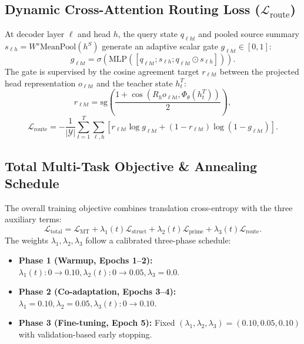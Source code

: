 \documentclass[11pt,a4paper]{article}
\begin{document}
\subsection{Dynamic Cross-Attention Routing Loss ($\mathcal{L}_{\text{route}}$)}
At decoder layer $\ell$ and head $h$, the query state $q_{\ell h t}$ and pooled source summary $s_{\ell h} = W^s \text{MeanPool}(h^S)$ generate an adaptive scalar gate $g_{\ell h t} \in [0, 1]$:
\begin{equation}
    g_{\ell h t} = \sigma\left(\text{MLP}\left([q_{\ell h t}; s_{\ell h}; q_{\ell h t} \odot s_{\ell h}]\right)\right).
\end{equation}
The gate is supervised by the cosine agreement target $r_{\ell h t}$ between the projected head representation $o_{\ell h t}$ and the teacher state $h_t^T$:
\begin{equation}
    r_{\ell h t} = \text{sg}\left(\frac{1 + \cos(R_h o_{\ell h t}, \Phi_\theta(h_t^T))}{2}\right),
\end{equation}
\begin{equation}
    \mathcal{L}_{\text{route}} = -\frac{1}{|\mathcal{Y}|} \sum_{t=1}^T \sum_{\ell, h} \left[ r_{\ell h t} \log g_{\ell h t} + (1 - r_{\ell h t}) \log (1 - g_{\ell h t}) \right].
\end{equation}

\subsection{Total Multi-Task Objective \& Annealing Schedule}
The overall training objective combines translation cross-entropy with the three auxiliary terms:
\begin{equation}
    \mathcal{L}_{\text{total}} = \mathcal{L}_{\text{MT}} + \lambda_1(t) \mathcal{L}_{\text{struct}} + \lambda_2(t) \mathcal{L}_{\text{prime}} + \lambda_3(t) \mathcal{L}_{\text{route}}.
\end{equation}
The weights $\lambda_1, \lambda_2, \lambda_3$ follow a calibrated three-phase schedule:
\begin{itemize}[leftmargin=*]
    \item \textbf{Phase 1 (Warmup, Epochs 1--2):} $\lambda_1(t): 0 \rightarrow 0.10, \lambda_2(t): 0 \rightarrow 0.05, \lambda_3 = 0.0$.
    \item \textbf{Phase 2 (Co-adaptation, Epochs 3--4):} $\lambda_1 = 0.10, \lambda_2 = 0.05, \lambda_3(t): 0 \rightarrow 0.10$.
    \item \textbf{Phase 3 (Fine-tuning, Epoch 5):} Fixed $(\lambda_1, \lambda_2, \lambda_3) = (0.10, 0.05, 0.10)$ with validation-based early stopping.
\end{itemize}
\end{document}
